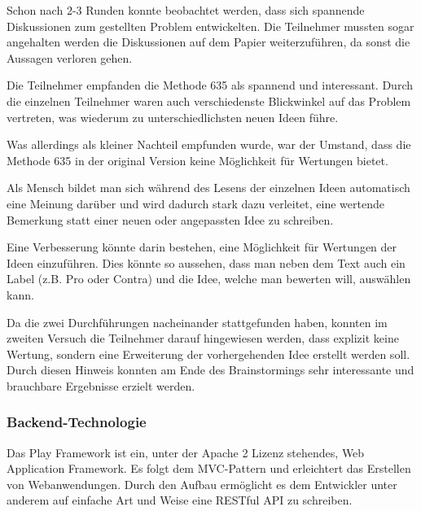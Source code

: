 \begin{description}[leftmargin=!,labelwidth=\widthof{\bfseries Zielstrebige Lösungsfindung }]
	\item[Diskussion gestartet] Schon nach 2-3 Runden konnte beobachtet werden, dass sich spannende Diskussionen zum gestellten Problem entwickelten. Die Teilnehmer mussten sogar angehalten werden die Diskussionen auf dem Papier weiterzuführen, da sonst die Aussagen verloren gehen.
	
	\item[Interessante Methode] Die Teilnehmer empfanden die Methode 635 als spannend und interessant. Durch die einzelnen Teilnehmer waren auch verschiedenste Blickwinkel auf das Problem vertreten, was wiederum zu unterschiedlichsten neuen Ideen führe.
	
	\item[Wertung einführen] Was allerdings als kleiner Nachteil empfunden wurde, war der Umstand, dass die Methode 635 in der original Version keine Möglichkeit für Wertungen bietet. 
	
	Als Mensch bildet man sich während des Lesens der einzelnen Ideen automatisch eine Meinung darüber und wird dadurch stark dazu verleitet, eine wertende Bemerkung statt einer neuen oder angepassten Idee zu schreiben.
	
	Eine Verbesserung könnte darin bestehen, eine Möglichkeit für Wertungen der Ideen einzuführen. Dies könnte so aussehen, dass man neben dem Text auch ein Label (z.B. Pro oder Contra) und die Idee, welche man bewerten will, auswählen kann.
	
	\item[Zielstrebige Lösungsfindung] Da die zwei Durchführungen nacheinander stattgefunden haben, konnten im zweiten Versuch die Teilnehmer darauf hingewiesen werden, dass explizit keine Wertung, sondern eine Erweiterung der vorhergehenden Idee erstellt werden soll. Durch diesen Hinweis konnten am Ende des Brainstormings sehr interessante und brauchbare Ergebnisse erzielt werden.
\end{description}

\subsubsection{Backend-Technologie}
Das Play Framework \cite{PlayFramework} ist ein, unter der Apache 2 Lizenz stehendes, Web Application Framework. Es folgt dem MVC-Pattern und erleichtert das Erstellen von Webanwendungen. Durch den Aufbau ermöglicht es dem Entwickler unter anderem auf einfache Art und Weise eine RESTful API zu schreiben. 

